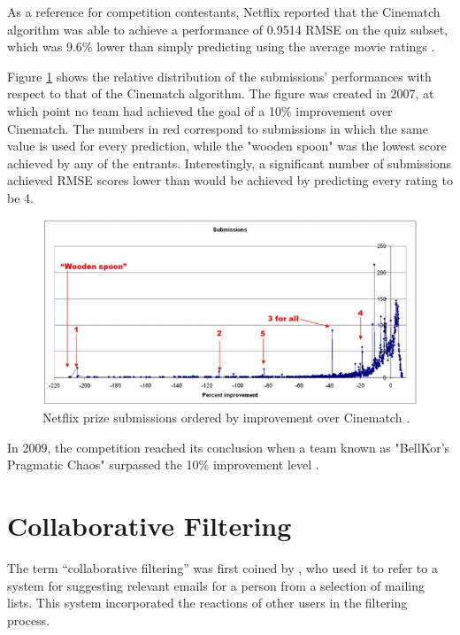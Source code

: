 As a reference for competition contestants, Netflix reported that the Cinematch algorithm was able to achieve a performance of 0.9514 RMSE on the quiz subset, which was 9.6\% lower than simply predicting using the average movie ratings \parencite{netflix_description}.

Figure \ref{fig:netflix_submissions} shows the relative distribution of the submissions' performances with respect to that of the Cinematch algorithm. The figure was created in 2007, at which point no team had achieved the goal of a 10\% improvement over Cinematch. The numbers in red correspond to submissions in which the same value is used for every prediction, while the "wooden spoon" was the lowest score achieved by any of the entrants. Interestingly, a significant number of submissions achieved RMSE scores lower than would be achieved by predicting every rating to be 4.

\begin{figure}[H]
\centering
\includegraphics[width=13cm]{Figures/2_1_netflix-prize.png}
\decoRule
\caption[Netflix submissions]{Netflix prize submissions ordered by improvement over Cinematch \parencite{netflix_description}.}
\label{fig:netflix_submissions}
\end{figure}

In 2009, the competition reached its conclusion when a team known as "BellKor's Pragmatic Chaos" surpassed the 10\% improvement level \parencite{netflix_bellkor}.

\section{Collaborative Filtering}
The term ``collaborative filtering'' was first coined by \cite{cf_1.3_origin}, who used it to refer to a system for suggesting relevant emails for a person from a selection of mailing lists. This system incorporated the reactions of other users in the filtering process.

